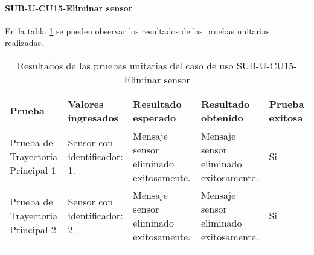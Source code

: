 \paragraph{SUB-U-CU15-Eliminar sensor}\label{SUB-U-CU15:Pruebas}
En la tabla \ref{pruebas_unitarias_sub-u-cu15} se pueden observar los resultados de las pruebas unitarias realizadas.
\begin{longtable}{|M{2cm}| M{4.5cm}|M{3cm}|M{3cm}|M{1.5cm}|}
	\hline
	\textbf{Prueba} & \textbf{Valores ingresados} & \textbf{Resultado esperado} & \textbf{Resultado obtenido} & \textbf{Prueba exitosa} \\ \hline
	Prueba de Trayectoria Principal 1 & 
	Sensor con identificador: 1.
	& 
	Mensaje sensor eliminado exitosamente.
	&
	Mensaje sensor eliminado exitosamente.
	& Si \\ \hline

	Prueba de Trayectoria Principal 2 & 
	Sensor con identificador: 2.
	& 
	Mensaje sensor eliminado exitosamente.
	&
	Mensaje sensor eliminado exitosamente.
	& Si \\ \hline

	\caption{Resultados de las pruebas unitarias del caso de uso SUB-U-CU15-Eliminar sensor}
	\label{pruebas_unitarias_sub-u-cu15}
\end{longtable}